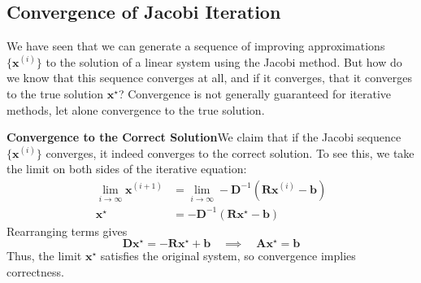 \subsection{Convergence of Jacobi Iteration}
We have seen that we can generate a sequence of improving approximations $\{\mathbf{x}^{(i)}\}$ to the solution of a linear system using the Jacobi method. But how do we know that this sequence converges at all, and if it converges, that it converges to the true solution $\mathbf{x}^\star$? Convergence is not generally guaranteed for iterative methods, let alone convergence to the true solution.

\textbf{Convergence to the Correct Solution}\quad We claim that if the Jacobi sequence $\{\mathbf{x}^{(i)}\}$ converges, it indeed converges to the correct solution. To see this, we take the limit on both sides of the iterative equation:
\begin{align*}
    \lim_{i \to \infty} \mathbf{x}^{(i+1)} & = \lim_{i \to \infty} -\mathbf{D}^{-1}(\mathbf{R}\mathbf{x}^{(i)} - \mathbf{b}) \\
    \mathbf{x}^\star &= -\mathbf{D}^{-1}(\mathbf{R}\mathbf{x}^\star - \mathbf{b})
\end{align*}
Rearranging terms gives
\begin{equation*}
    \mathbf{D}\mathbf{x}^\star = -\mathbf{R}\mathbf{x}^\star + \mathbf{b} 
    \quad \implies \quad 
    \mathbf{A}\mathbf{x}^\star = \mathbf{b}
\end{equation*}
Thus, the limit $\mathbf{x}^\star$ satisfies the original system, so convergence implies correctness.

